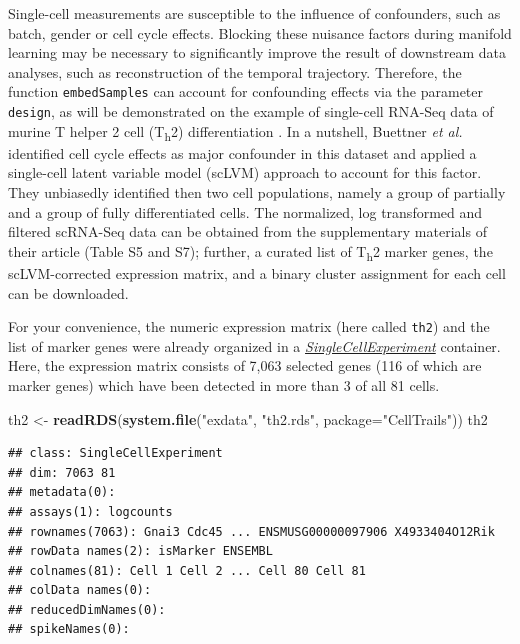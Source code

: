 \documentclass[]{book}
\newenvironment{Shaded}{\begin{snugshade}}{\end{snugshade}}
\newcommand{\KeywordTok}[1]{\textcolor[rgb]{0.13,0.29,0.53}{\textbf{#1}}}
\newcommand{\DataTypeTok}[1]{\textcolor[rgb]{0.13,0.29,0.53}{#1}}
\newcommand{\StringTok}[1]{\textcolor[rgb]{0.31,0.60,0.02}{#1}}
\newcommand{\NormalTok}[1]{#1}
\theoremstyle{definition}
\theoremstyle{definition}
\theoremstyle{definition}
\theoremstyle{remark}
\begin{document}
Single-cell measurements are susceptible to the influence of
confounders, such as batch, gender or cell cycle effects. Blocking these
nuisance factors during manifold learning may be necessary to
significantly improve the result of downstream data analyses, such as
reconstruction of the temporal trajectory. Therefore, the function
\texttt{embedSamples} can account for confounding effects via the
parameter \texttt{design}, as will be demonstrated on the example of
single-cell RNA-Seq data of murine T helper 2 cell (T\textsubscript{h}2)
differentiation \citep{mahata2014}. In a nutshell, Buettner \emph{et
al.} \citep{buettner2015} identified cell cycle effects as major
confounder in this dataset and applied a single-cell latent variable
model (scLVM) approach to account for this factor. They unbiasedly
identified then two cell populations, namely a group of partially and a
group of fully differentiated cells. The normalized, log transformed and
filtered scRNA-Seq data can be obtained from the supplementary materials
of their article (Table S5 and S7); further, a curated list of
T\textsubscript{h}2 marker genes, the scLVM-corrected expression matrix,
and a binary cluster assignment for each cell can be downloaded.

For your convenience, the numeric expression matrix (here called
\texttt{th2}) and the list of marker genes were already organized in a
\emph{\href{http://bioconductor.org/packages/SingleCellExperiment}{SingleCellExperiment}}
container. Here, the expression matrix consists of 7,063 selected genes
(116 of which are marker genes) which have been detected in more than 3
of all 81 cells.

\begin{Shaded}
\begin{Highlighting}[]
\NormalTok{th2 <-}\StringTok{ }\KeywordTok{readRDS}\NormalTok{(}\KeywordTok{system.file}\NormalTok{(}\StringTok{"exdata"}\NormalTok{, }\StringTok{"th2.rds"}\NormalTok{, }\DataTypeTok{package=}\StringTok{"CellTrails"}\NormalTok{))}
\NormalTok{th2}
\end{Highlighting}
\end{Shaded}

\begin{verbatim}
## class: SingleCellExperiment 
## dim: 7063 81 
## metadata(0):
## assays(1): logcounts
## rownames(7063): Gnai3 Cdc45 ... ENSMUSG00000097906 X4933404O12Rik
## rowData names(2): isMarker ENSEMBL
## colnames(81): Cell 1 Cell 2 ... Cell 80 Cell 81
## colData names(0):
## reducedDimNames(0):
## spikeNames(0):
\end{verbatim}
\end{document}
